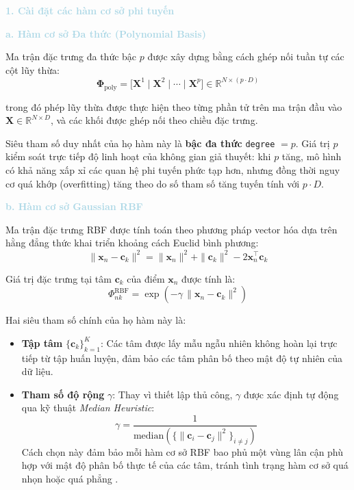 \noindent\textcolor{lightblue}{\textbf{1. Cài đặt các hàm cơ sở phi tuyến}}

\noindent\textcolor{lightblue}{\textbf{a. Hàm cơ sở Đa thức (Polynomial Basis)}}

Ma trận đặc trưng đa thức bậc $p$ được xây dựng bằng cách ghép nối
tuần tự các cột lũy thừa:
$$\boldsymbol{\Phi}_{\mathrm{poly}} 
  = \bigl[\mathbf{X}^1 \;\Big|\; \mathbf{X}^2 \;\Big|\; \cdots 
  \;\Big|\; \mathbf{X}^p\bigr] \in \mathbb{R}^{N \times (p \cdot D)}$$

trong đó phép lũy thừa được thực hiện theo từng phần tử trên 
ma trận đầu vào $\mathbf{X} \in \mathbb{R}^{N \times D}$, và các khối được 
ghép nối theo chiều đặc trưng.

Siêu tham số duy nhất của họ hàm này là \textbf{bậc đa thức} \texttt{degree} 
$= p$. Giá trị $p$ kiểm soát trực tiếp độ linh hoạt của không gian giả thuyết: 
khi $p$ tăng, mô hình có khả năng xấp xỉ các quan hệ phi tuyến phức tạp hơn, 
nhưng đồng thời nguy cơ quá khớp (overfitting) tăng theo do số tham số tăng 
tuyến tính với $p \cdot D$.

\noindent\textcolor{lightblue}{\textbf{b. Hàm cơ sở Gaussian RBF}}

Ma trận đặc trưng RBF được tính toán theo phương pháp vector hóa 
 dựa trên hằng đẳng thức khai triển khoảng cách 
Euclid bình phương:
$$\|\boldsymbol{x}_n - \boldsymbol{c}_k\|^2 
  = \|\boldsymbol{x}_n\|^2 + \|\boldsymbol{c}_k\|^2 
  - 2\boldsymbol{x}_n^{\top}\boldsymbol{c}_k$$

Giá trị đặc trưng tại tâm $\boldsymbol{c}_k$ của điểm $\boldsymbol{x}_n$ 
được tính là:
$$\Phi_{nk}^{\mathrm{RBF}} 
  = \exp\!\left(-\gamma\,\|\boldsymbol{x}_n - \boldsymbol{c}_k\|^2\right)$$

Hai siêu tham số chính của họ hàm này là:
\begin{itemize} [labelsep=10pt, leftmargin=2cm]
    \item \textbf{Tập tâm} $\{\boldsymbol{c}_k\}_{k=1}^{K}$: Các tâm được 
    lấy mẫu ngẫu nhiên không hoàn lại trực 
    tiếp từ tập huấn luyện, đảm bảo các tâm phân bố theo mật độ tự nhiên 
    của dữ liệu.
    \item \textbf{Tham số độ rộng} $\gamma$: Thay vì thiết lập thủ công, 
    $\gamma$ được xác định tự động qua kỹ thuật \textit{Median Heuristic}:
    $$\gamma = \frac{1}{\mathrm{median}\!\left(\{\|\boldsymbol{c}_i 
      - \boldsymbol{c}_j\|^2\}_{i \neq j}\right)}$$
    Cách chọn này đảm bảo mỗi hàm cơ sở RBF bao phủ một vùng lân cận 
    phù hợp với mật độ phân bố thực tế của các tâm, tránh tình trạng 
    hàm cơ sở quá nhọn hoặc quá phẳng .
\end{itemize}


